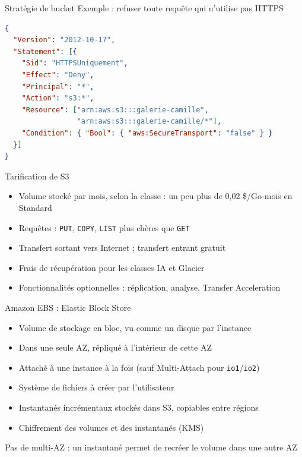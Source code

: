 \begin{frame}[fragile]{Stratégie de bucket}
  Exemple : refuser toute requête qui n'utilise pas HTTPS
\begin{lstlisting}[language=json]
{
  "Version": "2012-10-17",
  "Statement": [{
    "Sid": "HTTPSUniquement",
    "Effect": "Deny",
    "Principal": "*",
    "Action": "s3:*",
    "Resource": ["arn:aws:s3:::galerie-camille",
                 "arn:aws:s3:::galerie-camille/*"],
    "Condition": { "Bool": { "aws:SecureTransport": "false" } }
  }]
}
\end{lstlisting}
\end{frame}

\begin{frame}{Tarification de S3}
  \begin{itemize}
    \setlength{\itemsep}{.5em}
    \item Volume stocké par mois, selon la classe : un peu plus de 0,02 \$/Go-mois en Standard
    \item Requêtes : \texttt{PUT}, \texttt{COPY}, \texttt{LIST} plus chères que \texttt{GET}
    \item Transfert sortant vers Internet ; transfert entrant gratuit
    \item Frais de récupération pour les classes IA et Glacier
    \item Fonctionnalités optionnelles : réplication, analyse, Transfer Acceleration
  \end{itemize}
\end{frame}

\begin{frame}{Amazon EBS : Elastic Block Store}
  \begin{itemize}
    \setlength{\itemsep}{.45em}
    \item Volume de stockage en bloc, vu comme un disque par l'instance
    \item Dans une seule AZ, répliqué à l'intérieur de cette AZ
    \item Attaché à une instance à la fois (sauf Multi-Attach pour \texttt{io1}/\texttt{io2})
    \item Système de fichiers à créer par l'utilisateur
    \item Instantanés incrémentaux stockés dans S3, copiables entre régions
    \item Chiffrement des volumes et des instantanés (KMS)
  \end{itemize}
  \bigskip
  \attention Pas de multi-AZ : un instantané permet de recréer le volume dans une autre AZ
\end{frame}

